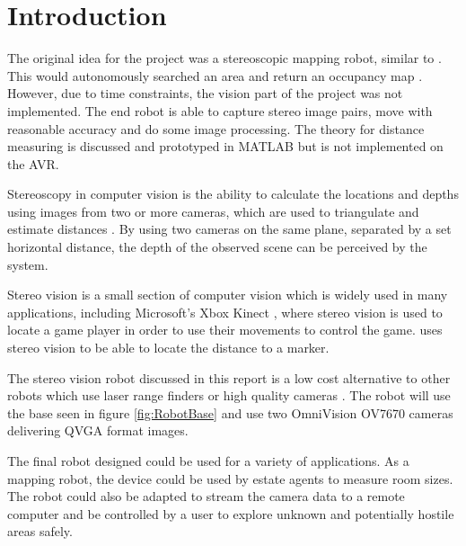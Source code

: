 \chapter{Introduction} \label{Chapter:Introduction}

%
%
%
%


The original idea for the project was a stereoscopic mapping robot, similar to \cite{Pirobot}. This would autonomously searched an area and return an occupancy map \citep{thrun2003learning}. However, due to time constraints, the vision part of the project was not implemented. The end robot is able to capture stereo image pairs, move with reasonable accuracy and do some image processing. The theory for distance measuring is discussed and prototyped in MATLAB but is not implemented on the AVR.

Stereoscopy in computer vision is the ability to calculate the locations and depths using images from two or more cameras, which are used to triangulate and estimate distances \citep{Saxena:DepthEstimation}. By using two cameras on the same plane, separated by a set horizontal distance, the depth of the observed scene can be perceived by the system.

Stereo vision is a small section of computer vision which is widely used in many applications, including Microsoft's Xbox Kinect \citep{Microsoft:Kinect}, where stereo vision is used to locate a game player in order to use their movements to control the game. \cite{Mrovlje:Distance_Stereoscopic} uses stereo vision to be able to locate the distance to a marker. 

The stereo vision robot discussed in this report is a low cost alternative to other robots which use laser range finders or high quality cameras \citep{Se:MappingRobot}. The robot will use the base seen in figure \ref{fig:RobotBase} and use two OmniVision OV7670 cameras delivering QVGA format images.

The final robot designed could be used for a variety of applications. As a mapping robot, the device could be used by estate agents to measure room sizes. The robot could also be adapted to stream the camera data to a remote computer and be controlled by a user to explore unknown and potentially hostile areas safely. 


